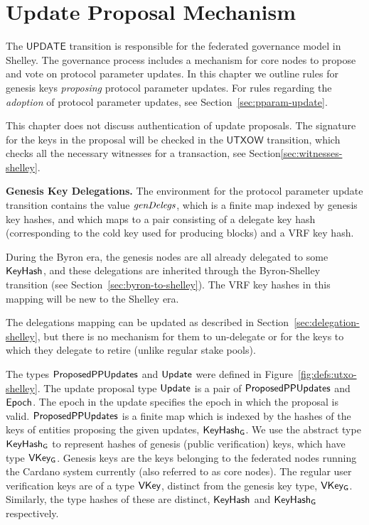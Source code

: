\section{Update Proposal Mechanism}
\label{sec:update}


The $\mathsf{UPDATE}$ transition is responsible for the federated governance model in Shelley.
The governance process includes a mechanism for core nodes to propose and vote on
protocol parameter updates. In this chapter we
outline rules for genesis keys \textit{proposing} protocol parameter updates.
For rules regarding the \textit{adoption} of protocol
parameter updates, see Section~\ref{sec:pparam-update}.

This chapter does not discuss authentication of update proposals.
The signature for the keys in the proposal will be checked in the
$\mathsf{UTXOW}$ transition, which checks all the necessary witnesses
for a transaction, see Section\ref{sec:witnesses-shelley}.

\textbf{Genesis Key Delegations.} The environment for the protocol parameter
update transition contains the value $\mathit{genDelegs}$,
which is a finite map indexed by genesis key hashes,
and which maps to a pair consisting of a delegate key hash
(corresponding to the cold key used for producing blocks) and
a VRF key hash.

During the Byron era, the genesis nodes are all
already delegated to some $\mathsf{KeyHash}$, and these delegations are inherited
through the Byron-Shelley transition (see Section~\ref{sec:byron-to-shelley}).
The VRF key hashes in this mapping will be new to the Shelley era.

The delegations mapping can be updated as described in
Section~\ref{sec:delegation-shelley},
but there is no mechanism for them to un-delegate or for the keys to which they delegate
to retire (unlike regular stake pools).

The types $\mathsf{ProposedPPUpdates}$ and $\mathsf{Update}$ were defined in
Figure~\ref{fig:defs:utxo-shelley}.
The update proposal type $\mathsf{Update}$ is a pair of $\mathsf{ProposedPPUpdates}$ and $\mathsf{Epoch}$.
The epoch in the update specifies the epoch in which the proposal is valid.
$\mathsf{ProposedPPUpdates}$ is a finite map which is indexed by the hashes of the keys of
entities proposing the given updates, $\mathsf{KeyHash_G}$.
We use the abstract type $\mathsf{KeyHash_G}$ to represent hashes of genesis
(public verification) keys, which have type $\mathsf{VKey_G}$.
Genesis keys are the keys belonging to the federated
nodes running the Cardano system currently (also referred to as core nodes).
The regular user verification keys are of a type $\mathsf{VKey}$, distinct from the
genesis key type, $\mathsf{VKey_G}$. Similarly, the type hashes of these
are distinct, $\mathsf{KeyHash}$ and $\mathsf{KeyHash_G}$ respectively.


